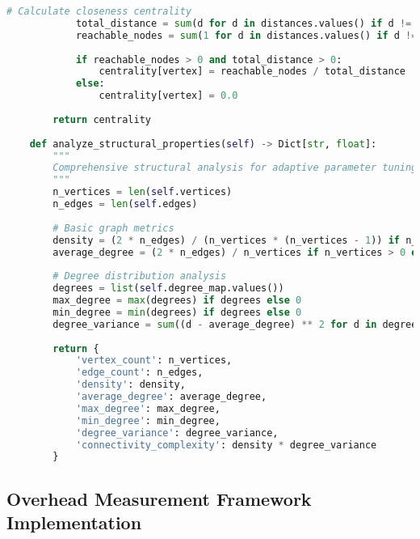 \begin{lstlisting}[language=Python, caption=Complete Graph Structure Analyzer Implementation]
            # Calculate closeness centrality
            total_distance = sum(d for d in distances.values() if d != float('inf'))
            reachable_nodes = sum(1 for d in distances.values() if d != float('inf')) - 1
            
            if reachable_nodes > 0 and total_distance > 0:
                centrality[vertex] = reachable_nodes / total_distance
            else:
                centrality[vertex] = 0.0
        
        return centrality
    
    def analyze_structural_properties(self) -> Dict[str, float]:
        """
        Comprehensive structural analysis for adaptive parameter tuning.
        """
        n_vertices = len(self.vertices)
        n_edges = len(self.edges)
        
        # Basic graph metrics
        density = (2 * n_edges) / (n_vertices * (n_vertices - 1)) if n_vertices > 1 else 0
        average_degree = (2 * n_edges) / n_vertices if n_vertices > 0 else 0
        
        # Degree distribution analysis
        degrees = list(self.degree_map.values())
        max_degree = max(degrees) if degrees else 0
        min_degree = min(degrees) if degrees else 0
        degree_variance = sum((d - average_degree) ** 2 for d in degrees) / len(degrees) if degrees else 0
        
        return {
            'vertex_count': n_vertices,
            'edge_count': n_edges,
            'density': density,
            'average_degree': average_degree,
            'max_degree': max_degree,
            'min_degree': min_degree,
            'degree_variance': degree_variance,
            'connectivity_complexity': density * degree_variance
        }
\end{lstlisting}


\subsection{Overhead Measurement Framework Implementation}
\label{appendix:overhead-measurement}

